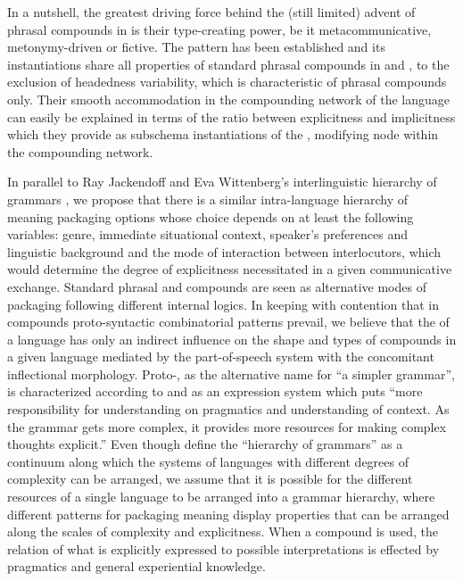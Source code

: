 \documentclass[output=paper]{LSP/langsci}
\begin{document}
In a nutshell, the greatest driving force behind the (still limited) advent of phrasal compounds in  is their type-creating power, be it metacommunicative, metonymy-driven or fictive. The pattern has been established and its instantiations share all properties of standard phrasal compounds in  and , to the exclusion of headedness variability, which is characteristic of  phrasal compounds only. Their smooth accommodation in the compounding network of the language can easily be explained in terms of the ratio between explicitness and implicitness which they provide as subschema instantiations of the , modifying  node within the compounding network. 


In parallel to Ray Jackendoff and Eva Wittenberg’s interlinguistic hierarchy of grammars \citep{Jackendoff2012}, we propose that there is a similar intra-language hierarchy of meaning packaging options whose choice depends on at least the following variables: genre, immediate situational context, speaker’s preferences and linguistic background and the mode of interaction between interlocutors, which would determine the degree of explicitness necessitated in a given communicative exchange. Standard phrasal  and compounds are seen as alternative modes of packaging following different internal logics. In keeping with  contention that in compounds proto-syntactic combinatorial patterns prevail, we believe that the  of a language has only an indirect influence on the shape and types of compounds in a given language mediated by the part-of-speech system with the concomitant inflectional morphology. Proto-, as the alternative name for “a simpler grammar”, is characterized according to \citet{Jackendoff2009} and  \citet[1]{Jackendoff2012} as an expression system which puts “more responsibility for understanding on pragmatics and understanding of context. As the grammar gets more complex, it provides more resources for making complex thoughts explicit.” Even though \citeauthor{Jackendoff2012} define the “hierarchy of grammars” as a continuum along which the  systems of languages with different degrees of complexity can be arranged, we assume that it is possible for the different resources of a single language to be arranged into a grammar hierarchy, where different patterns for packaging meaning display properties that can be arranged along the scales of complexity and explicitness. When a compound is used, the relation of what is explicitly expressed to possible interpretations is effected by pragmatics and general experiential knowledge.
\end{document}

